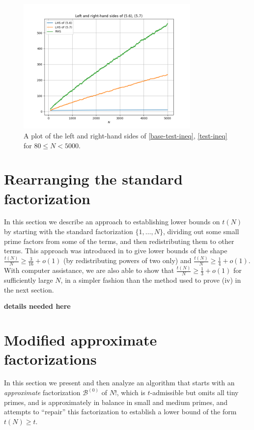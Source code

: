 \documentclass[12pt,a4paper,reqno]{amsart}
\numberwithin{equation}{section}
\theoremstyle{plain}
\theoremstyle{definition}
\newcommand\tuple{{\mathcal B}}
\begin{document}
\begin{figure}
  \centering
  \includegraphics[width=0.8\textwidth]{lhs_rhs.png}
  \caption{A plot of the left and right-hand sides of \eqref{base-test-ineq}, \eqref{test-ineq} for $80 \leq N < 5000$.}\label{fig2}
\end{figure}

\section{Rearranging the standard factorization}\label{rearrange-sec}

In this section we describe an approach to establishing lower bounds on $t(N)$ by starting with the standard factorization $\{1,\dots,N\}$, dividing out some small prime factors from some of the terms, and then redistributing them to other terms.  This approach was introduced in \cite{guy} to give lower bounds of the shape $\frac{t(N)}{N} \geq \frac{3}{16} + o(1)$ (by redistributing powers of two only) and $\frac{t(N)}{N} \geq \frac{1}{4} + o(1)$.  With computer assistance, we are also able to show that $\frac{t(N)}{N} \geq \frac{1}{3}+o(1)$ for sufficiently large $N$, in a simpler fashion than the method used to prove (iv) in the next section.

\textbf{details needed here}


\section{Modified approximate factorizations}\label{approx-sec}

In this section we present and then analyze an algorithm that starts with an \emph{approximate} factorization $\tuple^{(0)}$ of $N!$, which is $t$-admissible but omits all tiny primes, and is approximately in balance in small and medium primes, and attempts to ``repair'' this factorization to establish a lower bound of the form $t(N) \geq t$.  
\end{document}
